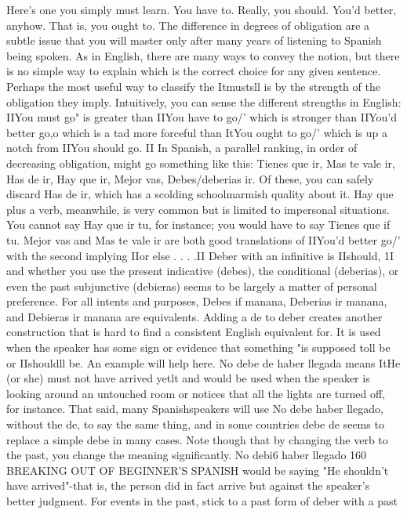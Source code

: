 \documentclass[14pt,a4paper,oneside]{memoir}
\begin{document}
{{{{%
Here's one you simply must learn. You have to. Really, you
should. You'd better, anyhow. That is, you ought to.
The difference in degrees of obligation are a subtle issue that
you will master only after many years of listening to Spanish being
spoken. As in English, there are many ways to convey the notion, but
there is no simple way to explain which is the correct choice for any
given sentence.
Perhaps the most useful way to classify the Itmustsll is by the
strength of the obligation they imply. Intuitively, you can sense the
different strengths in English: IIYou must go" is greater than IIYou have
to go/' which is stronger than IIYou'd better go,o which is a tad more
forceful than ItYou ought to go/' which is up a notch from IIYou should
go. II In Spanish, a parallel ranking, in order of decreasing obligation,
might go something like this: Tienes que ir, Mas te vale ir, Has de ir,
Hay que ir, Mejor vas, Debes/deberias ir. Of these, you can safely discard Has de ir, which has a scolding schoolmarmish quality about it.
Hay que plus a verb, meanwhile, is very common but is limited to impersonal situations. You cannot say Hay que ir tu, for instance; you
would have to say Tienes que if tu. Mejor vas and Mas te vale ir are
both good translations of IIYou'd better go/' with the second implying
IIor else . . . .II
Deber with an infinitive is IIshould, 1I and whether you use the
present indicative (debes), the conditional (deberias), or even the past
subjunctive (debieras) seems to be largely a matter of personal preference. For all intents and purposes, Debes if manana, Deberias ir manana, and Debieras ir manana are equivalents.
Adding a de to deber creates another construction that is
hard to find a consistent English equivalent for. It is used when the
speaker has some sign or evidence that something "is supposed toll
be or IIshouldll be. An example will help here. No debe de haber llegada means ItHe (or she) must not have arrived yetlt and would be used
when the speaker is looking around an untouched room or notices that
all the lights are turned off, for instance. That said, many Spanishspeakers will use No debe haber llegado, without the de, to say the
same thing, and in some countries debe de seems to replace a simple
debe in many cases. Note though that by changing the verb to the
past, you change the meaning significantly. No debi6 haber llegado
160 BREAKING OUT OF BEGINNER'S SPANISH
would be saying "He shouldn't have arrived"-that is, the person did
in fact arrive but against the speaker's better judgment.
For events in the past, stick to a past form of deber with a past
}}}}
\end{document}
